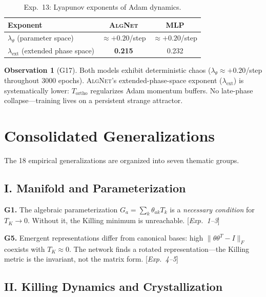 \documentclass[11pt,a4paper]{article}
\newcommand{\TK}{T_K}
\newcommand{\Tortho}{T_{\mathrm{ortho}}}
\newcommand{\AlgNet}{\textsc{AlgNet}}
\theoremstyle{definition}
\newtheorem{observation}{Observation}
\begin{document}
\begin{table}[H]
\centering
\caption{Exp.~13: Lyapunov exponents of Adam dynamics.}
\label{tab:exp13}
\begin{tabular}{lcc}
\toprule
Exponent & \AlgNet{} & MLP \\
\midrule
$\lambda_\theta$ (parameter space)   & $\approx +0.20$/step & $\approx +0.20$/step \\
$\lambda_{\mathrm{ext}}$ (extended phase space) & \textbf{0.215} & 0.232 \\
\bottomrule
\end{tabular}
\end{table}

\begin{observation}[G17]
Both models exhibit deterministic chaos ($\lambda_\theta \approx +0.20$/step 
throughout 3000 epochs). \AlgNet{}'s extended-phase-space exponent 
($\lambda_{\mathrm{ext}}$) is systematically lower: $\Tortho$ regularizes 
Adam momentum buffers. No late-phase collapse---training lives on a 
persistent strange attractor.
\end{observation}


\section{Consolidated Generalizations}
\label{sec:generalizations}

The 18 empirical generalizations are organized into seven thematic groups.

\subsection{I. Manifold and Parameterization}

\noindent\textbf{G1.} The algebraic parameterization $G_a = \sum_k \theta_{ak} T_k$ is a 
\emph{necessary condition} for $\TK \to 0$. Without it, the Killing minimum is 
unreachable. [\emph{Exp.~1--3}]

\noindent\textbf{G5.} Emergent representations differ from canonical bases: high 
$\|\theta\theta^T - I\|_F$ coexists with $\TK \approx 0$. The network finds a 
rotated representation---the Killing metric is the invariant, not the matrix form. 
[\emph{Exp.~4--5}]

\subsection{II. Killing Dynamics and Crystallization}
\end{document}
